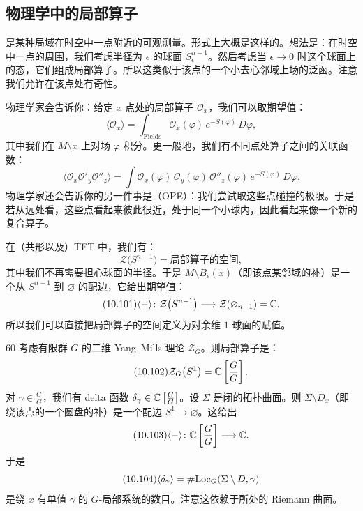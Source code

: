 \subsection{物理学中的局部算子}\label{sec:10-5-3}

是某种局域在时空中一点附近的可观测量。形式上大概是这样的。想法是：在时空中一点的周围，我们考虑半径为 $\epsilon$ 的球面 $S^{n-1}_{\epsilon}$。然后考虑当 $\epsilon\to0$ 时这个球面上的态，它们组成局部算子。所以这类似于该点的一个小去心邻域上场的泛函。注意我们允许在该点处有奇性。

物理学家会告诉你：给定 $x$ 点处的局部算子 $\mathcal{O}_x$，我们可以取期望值：
\begin{equation}\tag{10.98}
\langle\mathcal{O}_x\rangle=\int_{\mathrm{Fields}}\mathcal{O}_x(\varphi)\,e^{-S(\varphi)}\,D\varphi,
\end{equation}
其中我们在 $M\setminus x$ 上对场 $\varphi$ 积分。更一般地，我们有不同点处算子之间的关联函数：
\begin{equation}\tag{10.99}
\big\langle\mathcal{O}_x\mathcal{O}'_y\mathcal{O}''_z\big\rangle=\int \mathcal{O}_x(\varphi)\,\mathcal{O}_y(\varphi)\,\mathcal{O}''_z(\varphi)\,e^{-S(\varphi)}\,D\varphi.
\end{equation}
物理学家还会告诉你的另一件事是（OPE）：我们尝试取这些点碰撞的极限。于是若从远处看，这些点看起来彼此很近，处于同一个小球内，因此看起来像一个新的复合算子。

在（共形以及）TFT 中，我们有：
\begin{equation}\tag{10.100}
\mathcal{Z}\big(S^{n-1}\big)=\text{局部算子的空间},
\end{equation}
其中我们不再需要担心球面的半径。于是 $M\setminus B_{\epsilon}(x)$（即该点某邻域的补）是一个从 $S^{n-1}$ 到 $\varnothing$ 的配边，它给出期望值：
\begin{equation}\tag{10.101}
\langle-\rangle\colon \mathcal{Z}\big(S^{n-1}\big)\longrightarrow\mathcal{Z}(\varnothing_{n-1})=\mathbb{C}.
\end{equation}
所以我们可以直接把局部算子的空间定义为对余维 $1$ 球面的赋值。

\begin{srcex}{60}
考虑有限群 $G$ 的二维 Yang--Mills 理论 $\mathcal{Z}_G$。则局部算子是：
\begin{equation}\tag{10.102}
\mathcal{Z}_G\big(S^1\big)=\mathbb{C}\left[\frac{G}{G}\right].
\end{equation}
对 $\gamma\in\frac{G}{G}$，我们有 delta 函数 $\delta_{\gamma}\in\mathbb{C}\left[\frac{G}{G}\right]$。设 $\Sigma$ 是闭的拓扑曲面。则 $\Sigma\setminus D_x$（即绕该点的一个圆盘的补）是一个配边 $S^1\to\varnothing$。这给出
\begin{equation}\tag{10.103}
\langle-\rangle\colon\mathbb{C}\left[\frac{G}{G}\right]\longrightarrow\mathbb{C}.
\end{equation}
于是
\begin{equation}\tag{10.104}
\langle\delta_{\gamma}\rangle=\#\mathrm{Loc}_G(\Sigma\setminus D,\gamma)
\end{equation}
是绕 $x$ 有单值 $\gamma$ 的 $G$-局部系统的数目。注意这依赖于所处的 Riemann 曲面。
\end{srcex}

